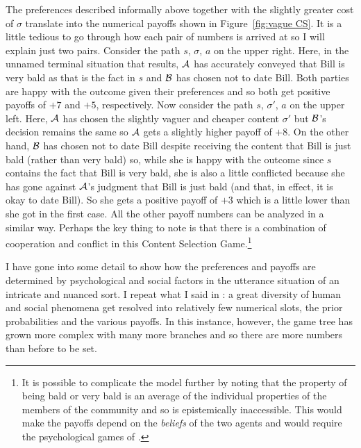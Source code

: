 The preferences described informally above together with the slightly greater cost of $\sigma$ translate into the numerical payoffs shown in Figure~\ref{fig:vague CS}. It is a little tedious to go through how each pair of numbers is arrived at so I will explain just two pairs. Consider the path $s$, $\sigma$, $a$ on the upper right. Here, in the unnamed terminal situation that results, $\cal A$ has accurately conveyed that Bill is very bald as that is the fact in $s$ and $\cal B$ has chosen not to date Bill. Both parties are happy with the outcome given their preferences and so both get positive payoffs of $+7$ and $+5$, respectively. Now consider the path $s$, $\sigma'$, $a$ on the upper left. Here, $\cal A$ has chosen the slightly vaguer and cheaper content $\sigma'$ but $\cal B$'s decision remains the same so $\cal A$ gets a slightly higher payoff of $+8$. On the other hand, $\cal B$ has chosen not to date Bill despite receiving the content that Bill is just bald (rather than very bald) so, while she is happy with the outcome since $s$ contains the fact that Bill is very bald, she is also a little conflicted because she has gone against $\cal A$'s judgment that Bill is just bald (and that, in effect, it is okay to date Bill). So she gets a positive payoff of $+3$ which is a little lower than she got in the first case. All the other payoff numbers can be analyzed in a similar way. Perhaps the key thing to note is that there is a combination of cooperation and conflict in this Content Selection Game.\footnote{It is possible to complicate the model further by noting that the property of being bald or very bald is an average of the individual properties of the members of the community and so is epistemically inaccessible. This would make the payoffs depend on the \emph{beliefs} of the two agents and would require the psychological games of \citet{gps:pgsr}.}

I have gone into some detail to show how the preferences and payoffs are determined by psychological and social factors in the utterance situation of an intricate and nuanced sort. I repeat what I said in : a great diversity of human and social phenomena get resolved into relatively few numerical slots, the prior probabilities and the various payoffs. In this instance, however, the game tree has grown more complex with many more branches and so there are more numbers than before to be set.\largerpage

